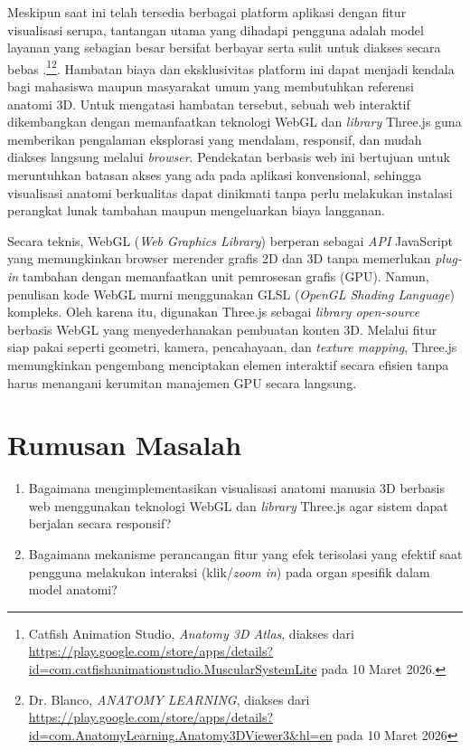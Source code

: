         Meskipun saat ini telah tersedia berbagai platform aplikasi dengan fitur visualisasi serupa, tantangan utama yang dihadapi pengguna adalah model layanan yang sebagian besar bersifat berbayar serta sulit untuk diakses secara bebas .\footnote{Catfish Animation Studio, \textit{Anatomy 3D Atlas}, diakses dari \url{https://play.google.com/store/apps/details?id=com.catfishanimationstudio.MuscularSystemLite} pada 10 Maret 2026.}\footnote{Dr. Blanco, \textit{ANATOMY LEARNING}, diakses dari \url{https://play.google.com/store/apps/details?id=com.AnatomyLearning.Anatomy3DViewer3&hl=en} pada 10 Maret 2026}. Hambatan biaya dan eksklusivitas platform ini dapat menjadi kendala bagi mahasiswa maupun masyarakat umum yang membutuhkan referensi anatomi 3D. Untuk mengatasi hambatan tersebut, sebuah web interaktif dikembangkan dengan memanfaatkan teknologi WebGL dan \textit{library} Three.js guna memberikan pengalaman eksplorasi yang mendalam, responsif, dan mudah diakses langsung melalui \textit{browser}. Pendekatan berbasis web ini bertujuan untuk meruntuhkan batasan akses yang ada pada aplikasi konvensional, sehingga visualisasi anatomi berkualitas  dapat dinikmati tanpa perlu melakukan instalasi perangkat lunak tambahan maupun mengeluarkan biaya langganan.
         
         Secara teknis, WebGL (\textit{Web Graphics Library}) berperan sebagai \textit{API} JavaScript yang memungkinkan browser merender grafis 2D dan 3D tanpa memerlukan \textit{plug-in} tambahan dengan memanfaatkan unit pemrosesan grafis (GPU). Namun, penulisan kode WebGL murni menggunakan GLSL (\textit{OpenGL Shading Language})  kompleks. Oleh karena itu, digunakan Three.js sebagai \textit{library open-source} berbasis WebGL yang menyederhanakan pembuatan konten 3D. Melalui fitur siap pakai seperti geometri, kamera, pencahayaan, dan \textit{texture mapping}, Three.js memungkinkan pengembang menciptakan elemen interaktif secara efisien tanpa harus menangani kerumitan manajemen GPU secara langsung.
        

\section{Rumusan Masalah}
\label{sec:rumusan}
      \begin{enumerate}
        \item Bagaimana mengimplementasikan visualisasi anatomi manusia 3D berbasis web menggunakan teknologi WebGL dan \textit{library} Three.js agar sistem dapat berjalan secara responsif?
        \item Bagaimana mekanisme perancangan fitur yang efek terisolasi yang efektif saat pengguna melakukan interaksi (klik/\textit{zoom in}) pada organ spesifik dalam model anatomi?
    \end{enumerate}

